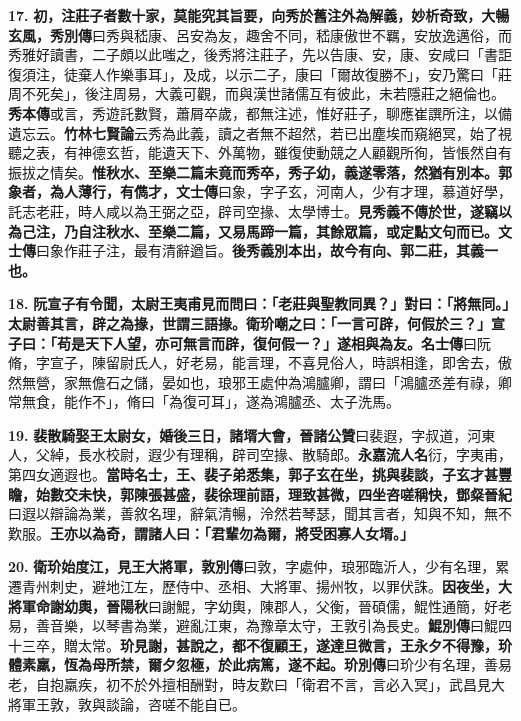 \textbf{17.} \textbf{初，注莊子者數十家，莫能究其旨要，向秀於舊注外為解義，妙析奇致，大暢玄風，}{\footnotesize \textbf{秀別傳}曰秀與嵇康、呂安為友，趣舍不同，嵇康傲世不羈，安放逸邁俗，而秀雅好讀書，二子頗以此嗤之，後秀將注莊子，先以告康、安，康、安咸曰「書詎復須注，徒棄人作樂事耳」，及成，以示二子，康曰「爾故復勝不」，安乃驚曰「莊周不死矣」，後注周易，大義可觀，而與漢世諸儒互有彼此，未若隱莊之絕倫也。\textbf{秀本傳}或言，秀遊託數賢，蕭屑卒歲，都無注述，惟好莊子，聊應崔譔所注，以備遺忘云。\textbf{竹林七賢論}云秀為此義，讀之者無不超然，若已出塵埃而窺絕冥，始了視聽之表，有神德玄哲，能遺天下、外萬物，雖復使動競之人顧觀所徇，皆悵然自有振拔之情矣。}\textbf{惟秋水、至樂二篇未竟而秀卒，秀子幼，義遂零落，然猶有別本。郭象者，為人薄行，有儁才，}{\footnotesize \textbf{文士傳}曰象，字子玄，河南人，少有才理，慕道好學，託志老莊，時人咸以為王弼之亞，辟司空掾、太學博士。}\textbf{見秀義不傳於世，遂竊以為己注，乃自注秋水、至樂二篇，又易馬蹄一篇，其餘眾篇，或定點文句而已。}{\footnotesize \textbf{文士傳}曰象作莊子注，最有清辭遒旨。}\textbf{後秀義別本出，故今有向、郭二莊，其義一也。}

\textbf{18.} \textbf{阮宣子有令聞，太尉王夷甫見而問曰：「老莊與聖教同異？」對曰：「將無同。」太尉善其言，辟之為掾，世謂三語掾。衛玠嘲之曰：「一言可辟，何假於三？」宣子曰：「苟是天下人望，亦可無言而辟，復何假一？」遂相與為友。}{\footnotesize \textbf{名士傳}曰阮脩，字宣子，陳留尉氏人，好老易，能言理，不喜見俗人，時誤相逢，即舍去，傲然無營，家無儋石之儲，晏如也，琅邪王處仲為鴻臚卿，謂曰「鴻臚丞差有祿，卿常無食，能作不」，脩曰「為復可耳」，遂為鴻臚丞、太子洗馬。}

\textbf{19.} \textbf{裴散騎娶王太尉女，婚後三日，諸壻大會，}{\footnotesize \textbf{晉諸公贊}曰裴遐，字叔道，河東人，父綽，長水校尉，遐少有理稱，辟司空掾、散騎郎。\textbf{永嘉流人名}衍，字夷甫，第四女適遐也。}\textbf{當時名士，王、裴子弟悉集，郭子玄在坐，挑與裴談，子玄才甚豐瞻，始數交未快，郭陳張甚盛，裴徐理前語，理致甚微，四坐咨嗟稱快，}{\footnotesize \textbf{鄧粲晉紀}曰遐以辯論為業，善敘名理，辭氣清暢，泠然若琴瑟，聞其言者，知與不知，無不歎服。}\textbf{王亦以為奇，謂諸人曰：「君輩勿為爾，將受困寡人女壻。」}

\textbf{20.} \textbf{衛玠始度江，見王大將軍，}{\footnotesize \textbf{敦別傳}曰敦，字處仲，琅邪臨沂人，少有名理，累遷青州刺史，避地江左，歷侍中、丞相、大將軍、揚州牧，以罪伏誅。}\textbf{因夜坐，大將軍命謝幼輿，}{\footnotesize \textbf{晉陽秋}曰謝鯤，字幼輿，陳郡人，父衡，晉碩儒，鯤性通簡，好老易，善音樂，以琴書為業，避亂江東，為豫章太守，王敦引為長史。\textbf{鯤別傳}曰鯤四十三卒，贈太常。}\textbf{玠見謝，甚說之，都不復顧王，遂達旦微言，王永夕不得豫，玠體素羸，恆為母所禁，爾夕忽極，於此病篤，遂不起。}{\footnotesize \textbf{玠別傳}曰玠少有名理，善易老，自抱羸疾，初不於外擅相酬對，時友歎曰「衛君不言，言必入冥」，武昌見大將軍王敦，敦與談論，咨嗟不能自已。}

